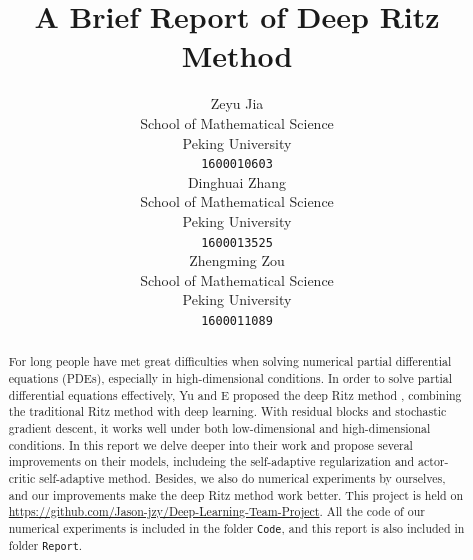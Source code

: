 \documentclass{article}
\title{A Brief Report of Deep Ritz Method}
\author{
  Zeyu Jia\\School of Mathematical Science\\Peking University\\ \texttt{1600010603} \\
  \And
  Dinghuai Zhang\\School of Mathematical Science\\Peking University\\ \texttt{1600013525}\\
  \And
  Zhengming Zou\\School of Mathematical Science\\Peking University \\ \texttt{1600011089}
}
\begin{document}

\maketitle

\begin{abstract}
\par For long people have met great difficulties when solving numerical partial differential equations (PDEs), especially in high-dimensional conditions. In order to solve partial differential equations effectively, Yu and E proposed the deep Ritz method \cite{yu2017deep}, combining the traditional Ritz method with deep learning. With residual blocks and stochastic gradient descent, it works well under both low-dimensional and high-dimensional conditions. In this report we delve deeper into their work and propose several improvements on their models, includeing the self-adaptive regularization and actor-critic self-adaptive method. Besides, we also do numerical experiments by ourselves, and our improvements make the deep Ritz method work better. This project is held on \url{https://github.com/Jason-jzy/Deep-Learning-Team-Project}. All the code of our numerical experiments is included in the folder \verb"Code", and this report is also included in folder \verb"Report".
\end{abstract}
\end{document}
